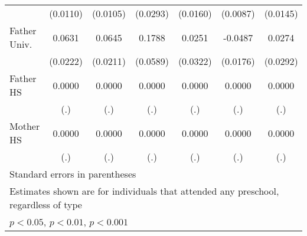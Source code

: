 \begin{table}[htbp]
\begin{tabular}{l*{6}{c}}
            &    (0.0110)         &    (0.0105)         &    (0.0293)         &    (0.0160)         &    (0.0087)         &    (0.0145)         \\
\addlinespace
Father Univ.&      0.0631\sym{**} &      0.0645\sym{**} &      0.1788\sym{**} &      0.0251         &     -0.0487\sym{**} &      0.0274         \\
            &    (0.0222)         &    (0.0211)         &    (0.0589)         &    (0.0322)         &    (0.0176)         &    (0.0292)         \\
\addlinespace
Father HS   &      0.0000         &      0.0000         &      0.0000         &      0.0000         &      0.0000         &      0.0000         \\
            &         (.)         &         (.)         &         (.)         &         (.)         &         (.)         &         (.)         \\
\addlinespace
Mother HS   &      0.0000         &      0.0000         &      0.0000         &      0.0000         &      0.0000         &      0.0000         \\
            &         (.)         &         (.)         &         (.)         &         (.)         &         (.)         &         (.)         \\
\bottomrule
\multicolumn{7}{l}{\footnotesize Standard errors in parentheses}\\
\multicolumn{7}{l}{\footnotesize Estimates shown are for individuals that attended any preschool, regardless of type}\\
\multicolumn{7}{l}{\footnotesize \sym{*} \(p<0.05\), \sym{**} \(p<0.01\), \sym{***} \(p<0.001\)}\\
\end{tabular}
\end{table}
